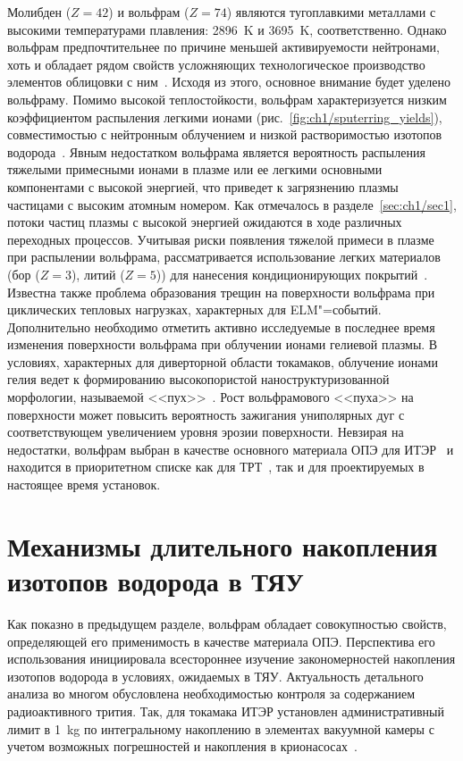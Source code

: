 Молибден ($Z=42$) и вольфрам ($Z=74$) являются тугоплавкими металлами с высокими температурами плавления: \SI{2896}{\kelvin} и \SI{3695}{\kelvin}, соответственно. Однако вольфрам предпочтительнее по причине меньшей активируемости нейтронами, хоть и обладает рядом свойств усложняющих технологическое производство элементов облицовки с ним~\cite{Piskarev2024}. Исходя из этого, основное внимание будет уделено вольфраму. Помимо высокой теплостойкости, вольфрам характеризуется низким коэффициентом распыления легкими ионами (рис.~\cref{fig:ch1/sputerring_yields}), совместимостью с нейтронным облучением и низкой растворимостью изотопов водорода~\cite{Roth2011, Pintsuk2012,Rieth2019}. Явным недостатком вольфрама является вероятность распыления тяжелыми примесными ионами в плазме или ее легкими основными компонентами с высокой энергией, что приведет к загрязнению плазмы частицами с высоким атомным номером. Как отмечалось в разделе~\cref{sec:ch1/sec1}, потоки частиц плазмы с высокой энергией ожидаются в ходе различных переходных процессов. Учитывая риски появления тяжелой примеси в плазме при распылении вольфрама, рассматривается использование легких материалов (бор ($Z=3$), литий ($Z=5$)) для нанесения кондиционирующих покрытий~\cite{Winter1996,Wauters2020}. Известна также проблема образования трещин на поверхности вольфрама при циклических тепловых нагрузках, характерных для ELM"=событий. Дополнительно необходимо отметить активно исследуемые в последнее время изменения поверхности вольфрама при облучении ионами гелиевой плазмы. В условиях, характерных для диверторной области токамаков, облучение ионами гелия ведет к формированию высокопористой наноструктуризованной морфологии, называемой <<пух>>~\cite{Ueda2018,Kajita2018,Fedorovich2019}. Рост вольфрамового <<пуха>> на поверхности может повысить вероятность зажигания униполярных дуг с соответствующем увеличением уровня эрозии поверхности. Невзирая на недостатки, вольфрам выбран в качестве основного материала ОПЭ для ИТЭР~\cite{Pitts2025} и находится в приоритетном списке как для ТРТ~\cite{Piskarev2024}, так и для проектируемых в настоящее время установок. 

\section{Механизмы длительного накопления изотопов водорода в ТЯУ}\label{sec:ch1/sec3}
Как показно в предыдущем разделе, вольфрам обладает совокупностью свойств, определяющей его применимость в качестве материала ОПЭ. Перспектива его использования инициировала всестороннее изучение закономерностей накопления изотопов водорода в условиях, ожидаемых в ТЯУ. Актуальность детального анализа во многом обусловлена необходимостью контроля за содержанием радиоактивного трития. Так, для токамака ИТЭР установлен административный лимит в \SI{1}{\kilogram} по интегральному накоплению в элементах вакуумной камеры с учетом возможных погрешностей и накопления в крионасосах~\cite{Roth1}.

